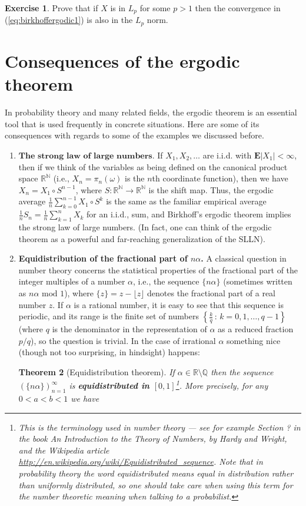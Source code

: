 \documentclass[11pt]{report}
\newcommand{\R}{\mathbb{R}}
\newcommand{\N}{\mathbb{N}}
\theoremstyle{plain}
\newtheorem{thm}{Theorem}[chapter]
\theoremstyle{definition}
\newtheorem{xexercise}[thm]{Exercise}
\begin{document}
\begin{xexercise}
Prove that if $X$ is in $L_p$ for some $p>1$ then the convergence in (\ref{eq:birkhoffergodic1})  is also in the $L_p$ norm.
\end{xexercise}

\section{Consequences of the ergodic theorem}
In probability theory and many related fields, the ergodic theorem is an essential tool that is used frequently in concrete situations. Here are some of its consequences with regards to some of the examples we discussed before.

\begin{enumerate}[label=\arabic*.]
\item $\textbf{The strong law of large numbers.}$ If $X_1,X_2,\ldots$ are i.i.d. with $\mathbf{E}|X_1|<\infty$, then if we think of the variables as being defined on the canonical product space $\R^\N$ (i.e., $X_n=\pi_n(\omega)$ is the $n$th coordinate function), then we have $X_n = X_1\circ S^{n-1}$, where $S:\R^\N\to\R^\N$ is the shift map. Thus, the ergodic average $\frac{1}{n} \sum_{k=0}^{n-1} X_1\circ S^k$ is the same as the familiar empirical average $\frac{1}{n} S_n = \frac{1}{n} \sum_{k=1}^n X_k$ for an i.i.d., sum, and Birkhoff's ergodic theorem implies the strong law of large numbers. (In fact, one can think of the ergodic theorem as a powerful and far-reaching generalization of the SLLN).
\item \textbf{Equidistribution of the fractional part of $n\alpha$.} A classical question in number theory concerns the statistical properties of the fractional part of the integer multiples of a number $\alpha$, i.e., the sequence $\{n \alpha \}$ (sometimes written as $n\alpha \textrm{ mod }1$), where $\{z\}=z-\lfloor z\rfloor$ denotes the fractional part of a real number $z$. If $\alpha$ is a rational number, it is easy to see that this sequence is periodic, and its range is the finite set of numbers $\left\{ \frac{k}{q}\,:\, k=0,1,\ldots,q-1 \right\}$ (where $q$ is the denominator in the representation of $\alpha$ as a reduced fraction $p/q$), so the question is trivial. In the case of irrational $\alpha$ something nice (though not too surprising, in hindsight) happens:

\begin{thm}[Equidistribution theorem]
\label{thm-equidistribution}
If $\alpha\in \R\setminus\mathbb{Q}$ then the sequence $( \{ n\alpha \} )_{n=1}^\infty$ is \textbf{equidistributed in $[0,1]$}\footnote{This is the terminology used in number theory --- see for example Section ? in the book \emph{An Introduction to the Theory of Numbers}, by Hardy and Wright, and the Wikipedia article \href{http://en.wikipedia.org/wiki/Equidistributed_sequence}{http://en.wikipedia.org/wiki/Equidistributed\_sequence}. Note that in probability theory the word \emph{equidistributed} means equal in distribution rather than uniformly distributed, so one should take care when using this term for the number theoretic meaning when talking to a probabilist.}. More precisely, for any $0<a<b<1$ we have


\end{thm}
\end{enumerate}
\end{document}
